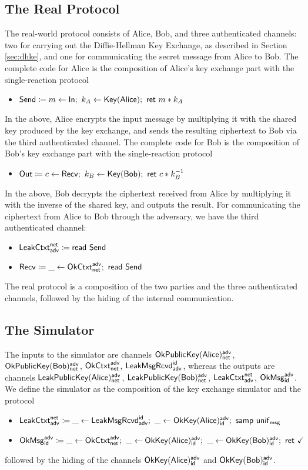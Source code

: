 \subsection{The Real Protocol}
The real-world protocol consists of Alice, Bob, and three authenticated channels: two for carrying out the Diffie-Hellman Key Exchange, as described in Section \ref{sec:dhke}, and one for communicating the secret message from Alice to Bob. The complete code for Alice is the composition of Alice's key exchange part with the single-reaction protocol
\begin{itemize}
\item $\Send \coloneqq m \leftarrow \In; \ k_A \leftarrow \Key(\Alice); \ \ret{m * k_A}$
\end{itemize}
In the above, Alice encrypts the input message by multiplying it with the shared key produced by the key exchange, and sends the resulting ciphertext to Bob via the third authenticated channel. The complete code for Bob is the composition of Bob's key exchange part with the single-reaction protocol
\begin{itemize}
\item $\Out \coloneqq c \leftarrow \Recv; \ k_B \leftarrow \Key(\Bob); \ \ret{c * k_B^{-1}}$
\end{itemize}
In the above, Bob decrypts the ciphertext received from Alice by multiplying it with the inverse of the shared key, and outputs the result. For communicating the ciphertext from Alice to Bob through the adversary, we have the third authenticated channel:
\begin{itemize}
\item $\mathsf{LeakCtxt}^{\mathsf{net}}_{\mathsf{adv}} \coloneqq \mathsf{read} \ \mathsf{Send}$
\item $\mathsf{Recv} \coloneqq \_ \leftarrow \mathsf{OkCtxt}^{\mathsf{adv}}_{\mathsf{net}}; \ \mathsf{read} \ \mathsf{Send}$
\end{itemize}
The real protocol is a composition of the two parties and the three authenticated channels, followed by the hiding of the internal communication. 

\subsection{The Simulator}
The inputs to the simulator are channels $\mathsf{OkPublicKey}(\mathsf{Alice})^{\mathsf{adv}}_{\mathsf{net}}$, $\mathsf{OkPublicKey}(\mathsf{Bob})^{\mathsf{adv}}_{\mathsf{net}}$, $\mathsf{OkCtxt}^{\mathsf{adv}}_{\mathsf{net}}$, $\mathsf{LeakMsgRcvd}^{\mathsf{id}}_{\mathsf{adv}}$, whereas the outputs are channels $\mathsf{LeakPublicKey}(\mathsf{Alice})^{\mathsf{adv}}_{\mathsf{net}}$, $\mathsf{LeakPublicKey}(\mathsf{Bob})^{\mathsf{adv}}_{\mathsf{net}}$, $\mathsf{LeakCtxt}^{\mathsf{net}}_{\mathsf{adv}}$, $\mathsf{OkMsg}^{\mathsf{adv}}_{\mathsf{id}}$. We define the simulator as the composition of the key exchange simulator and the protocol
\begin{itemize}
\item $\mathsf{LeakCtxt}^{\mathsf{net}}_{\mathsf{adv}} \coloneqq \_ \leftarrow \mathsf{LeakMsgRcvd}^{\mathsf{id}}_{\mathsf{adv}}; \ \_ \leftarrow \mathsf{OkKey}(\mathsf{Alice})^{\mathsf{adv}}_{\mathsf{id}}; \ \mathsf{samp} \ \mathsf{unif}_{\mathsf{msg}}$
\item $\OkMsg^\adv_\id \coloneqq \_ \leftarrow \OkCtxt^\adv_\net; \ \_ \leftarrow \OkKey(\Alice)^\adv_\id; \ \_ \leftarrow \OkKey(\Bob)^\adv_\id; \ \ret{\checkmark}$
\end{itemize}
followed by the hiding of the channels $\mathsf{OkKey}(\mathsf{Alice})^{\mathsf{adv}}_{\mathsf{id}}$ and $\mathsf{OkKey}(\mathsf{Bob})^{\mathsf{adv}}_{\mathsf{id}}$.


